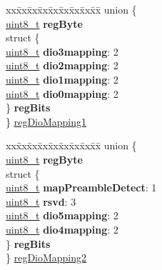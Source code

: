 \begin{DoxyCompactItemize}
\begin{tabbing}
xx\=xx\=xx\=xx\=xx\=xx\=xx\=xx\=xx\=\kill
union \{\\
\>\hyperlink{vl53l0x__types_8h_aba7bc1797add20fe3efdf37ced1182c5}{uint8\_t} {\bfseries regByte}\\
\>struct \{\\
\>\>\hyperlink{vl53l0x__types_8h_aba7bc1797add20fe3efdf37ced1182c5}{uint8\_t} {\bfseries dio3mapping}: 2\\
\>\>\hyperlink{vl53l0x__types_8h_aba7bc1797add20fe3efdf37ced1182c5}{uint8\_t} {\bfseries dio2mapping}: 2\\
\>\>\hyperlink{vl53l0x__types_8h_aba7bc1797add20fe3efdf37ced1182c5}{uint8\_t} {\bfseries dio1mapping}: 2\\
\>\>\hyperlink{vl53l0x__types_8h_aba7bc1797add20fe3efdf37ced1182c5}{uint8\_t} {\bfseries dio0mapping}: 2\\
\>\} {\bfseries regBits}\\
\} \hyperlink{structFSK__Register__Map_a6fc99b4cee31f80db04069140eebc6b1}{regDioMapping1}\\

\end{tabbing}\item 
\begin{tabbing}
xx\=xx\=xx\=xx\=xx\=xx\=xx\=xx\=xx\=\kill
union \{\\
\>\hyperlink{vl53l0x__types_8h_aba7bc1797add20fe3efdf37ced1182c5}{uint8\_t} {\bfseries regByte}\\
\>struct \{\\
\>\>\hyperlink{vl53l0x__types_8h_aba7bc1797add20fe3efdf37ced1182c5}{uint8\_t} {\bfseries mapPreambleDetect}: 1\\
\>\>\hyperlink{vl53l0x__types_8h_aba7bc1797add20fe3efdf37ced1182c5}{uint8\_t} {\bfseries rsvd}: 3\\
\>\>\hyperlink{vl53l0x__types_8h_aba7bc1797add20fe3efdf37ced1182c5}{uint8\_t} {\bfseries dio5mapping}: 2\\
\>\>\hyperlink{vl53l0x__types_8h_aba7bc1797add20fe3efdf37ced1182c5}{uint8\_t} {\bfseries dio4mapping}: 2\\
\>\} {\bfseries regBits}\\
\} \hyperlink{structFSK__Register__Map_aabbec529268ed5e8251a2ec965882d7f}{regDioMapping2}\\


\end{tabbing}
\end{DoxyCompactItemize}
